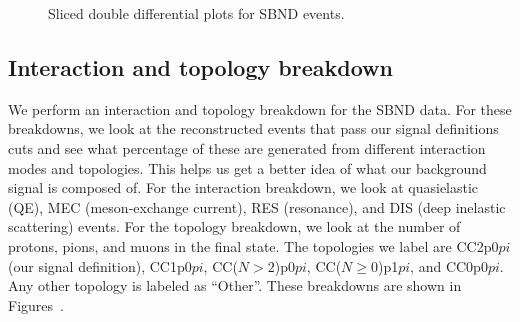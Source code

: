 \documentclass{article}
\begin{document}
\begin{figure}
    \caption{Sliced double differential plots for SBND events.}
    \label{fig:sbnd-double-diff-sliced}
\end{figure}

\subsection{Interaction and topology breakdown}

We perform an interaction and topology breakdown for the SBND data. For these breakdowns, 
we look at the reconstructed events that pass our signal definitions cuts and see what 
percentage of these are generated from different interaction modes and topologies. 
This helps us get a better idea of what our background signal is composed of. For the
interaction breakdown, we look at quasielastic (QE), MEC (meson-exchange current),
RES (resonance), and DIS (deep inelastic scattering) events. For the topology breakdown,
we look at the number of protons, pions, and muons in the final state. The topologies 
we label are CC2p0$pi$ (our signal definition), CC1p0$pi$, CC($N>2$)p0$pi$, CC($N\geq0$)p1$pi$, and CC0p0$pi$.
Any other topology is labeled as ``Other''.
These breakdowns are shown in Figures~.
\end{document}
